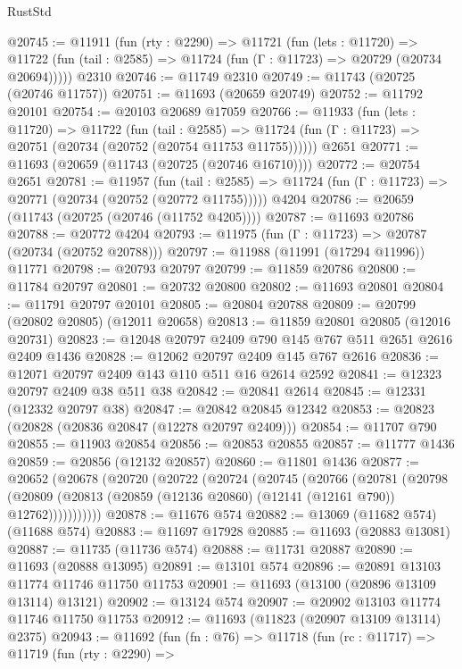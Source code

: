 \begin{lexlean}{RustStd}
\begin{coremodule}
@20745 := @11911
    (fun (rty : @2290) =>
    @11721
      (fun (lets : @11720) =>
      @11722 (fun (tail : @2585) => @11724 (fun (Γ : @11723) => @20729 (@20734 @20694)))))
    @2310
@20746 := @11749 @2310
@20749 := @11743 (@20725 (@20746 @11757))
@20751 := @11693 (@20659 @20749)
@20752 := @11792 @20101
@20754 := @20103 @20689 @17059
@20766 := @11933
    (fun (lets : @11720) =>
    @11722
      (fun (tail : @2585) =>
      @11724 (fun (Γ : @11723) => @20751 (@20734 (@20752 (@20754 @11753 @11755))))))
    @2651
@20771 := @11693 (@20659 (@11743 (@20725 (@20746 @16710))))
@20772 := @20754 @2651
@20781 := @11957
    (fun (tail : @2585) => @11724 (fun (Γ : @11723) => @20771 (@20734 (@20752 (@20772 @11755)))))
    @4204
@20786 := @20659 (@11743 (@20725 (@20746 (@11752 @4205))))
@20787 := @11693 @20786
@20788 := @20772 @4204
@20793 := @11975 (fun (Γ : @11723) => @20787 (@20734 (@20752 @20788)))
@20797 := @11988 (@11991 (@17294 @11996)) @11771
@20798 := @20793 @20797
@20799 := @11859 @20786
@20800 := @11784 @20797
@20801 := @20732 @20800
@20802 := @11693 @20801
@20804 := @11791 @20797 @20101
@20805 := @20804 @20788
@20809 := @20799 (@20802 @20805) (@12011 @20658)
@20813 := @11859 @20801 @20805 (@12016 @20731)
@20823 := @12048 @20797 @2409 @790 @145 @767 @511 @2651 @2616 @2409 @1436
@20828 := @12062 @20797 @2409 @145 @767 @2616
@20836 := @12071 @20797 @2409 @143 @110 @511 @16 @2614 @2592
@20841 := @12323 @20797 @2409 @38 @511 @38
@20842 := @20841 @2614
@20845 := @12331 (@12332 @20797 @38)
@20847 := @20842 @20845 @12342
@20853 := @20823 (@20828 (@20836 @20847 (@12278 @20797 @2409)))
@20854 := @11707 @790
@20855 := @11903 @20854
@20856 := @20853 @20855
@20857 := @11777 @1436
@20859 := @20856 (@12132 @20857)
@20860 := @11801 @1436
@20877 := @20652
    (@20678
      (@20720
        (@20722
          (@20724
            (@20745
              (@20766
                (@20781
                  (@20798
                    (@20809 (@20813 (@20859 (@12136 @20860) (@12141 (@12161 @790)) @12762)))))))))))
@20878 := @11676 @574
@20882 := @13069 (@11682 @574) (@11688 @574)
@20883 := @11697 @17928
@20885 := @11693 (@20883 @13081)
@20887 := @11735 (@11736 @574)
@20888 := @11731 @20887
@20890 := @11693 (@20888 @13095)
@20891 := @13101 @574
@20896 := @20891 @13103 @11774 @11746 @11750 @11753
@20901 := @11693 (@13100 (@20896 @13109 @13114) @13121)
@20902 := @13124 @574
@20907 := @20902 @13103 @11774 @11746 @11750 @11753
@20912 := @11693 (@11823 (@20907 @13109 @13114) @2375)
@20943 := @11692
    (fun (fn : @76) =>
    @11718
      (fun (rc : @11717) =>
      @11719
        (fun (rty : @2290) =>

\end{coremodule}
\end{lexlean}
